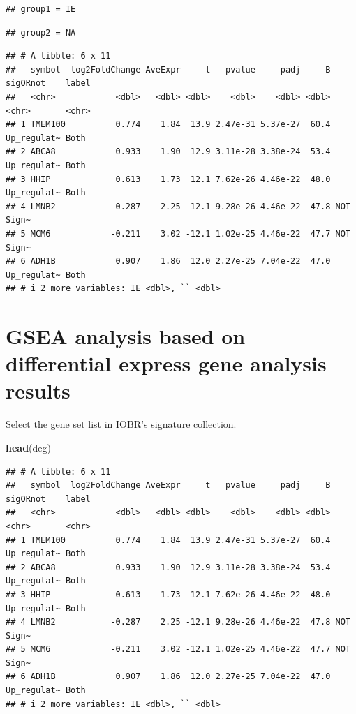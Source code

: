\documentclass[
  12pt,
]{book}
\newenvironment{Shaded}{\begin{snugshade}}{\end{snugshade}}
\newcommand{\FunctionTok}[1]{\textcolor[rgb]{0.13,0.29,0.53}{\textbf{#1}}}
\newcommand{\NormalTok}[1]{#1}
\begin{document}
\begin{verbatim}
## group1 = IE
\end{verbatim}

\begin{verbatim}
## group2 = NA
\end{verbatim}

\begin{verbatim}
## # A tibble: 6 x 11
##   symbol  log2FoldChange AveExpr     t   pvalue     padj     B sigORnot    label
##   <chr>            <dbl>   <dbl> <dbl>    <dbl>    <dbl> <dbl> <chr>       <chr>
## 1 TMEM100          0.774    1.84  13.9 2.47e-31 5.37e-27  60.4 Up_regulat~ Both 
## 2 ABCA8            0.933    1.90  12.9 3.11e-28 3.38e-24  53.4 Up_regulat~ Both 
## 3 HHIP             0.613    1.73  12.1 7.62e-26 4.46e-22  48.0 Up_regulat~ Both 
## 4 LMNB2           -0.287    2.25 -12.1 9.28e-26 4.46e-22  47.8 NOT         Sign~
## 5 MCM6            -0.211    3.02 -12.1 1.02e-25 4.46e-22  47.7 NOT         Sign~
## 6 ADH1B            0.907    1.86  12.0 2.27e-25 7.04e-22  47.0 Up_regulat~ Both 
## # i 2 more variables: IE <dbl>, `` <dbl>
\end{verbatim}

\hypertarget{gsea-analysis-based-on-differential-express-gene-analysis-results}{%
\section{GSEA analysis based on differential express gene analysis results}\label{gsea-analysis-based-on-differential-express-gene-analysis-results}}

Select the gene set list in IOBR's signature collection.

\begin{Shaded}
\begin{Highlighting}[]
\FunctionTok{head}\NormalTok{(deg)}
\end{Highlighting}
\end{Shaded}

\begin{verbatim}
## # A tibble: 6 x 11
##   symbol  log2FoldChange AveExpr     t   pvalue     padj     B sigORnot    label
##   <chr>            <dbl>   <dbl> <dbl>    <dbl>    <dbl> <dbl> <chr>       <chr>
## 1 TMEM100          0.774    1.84  13.9 2.47e-31 5.37e-27  60.4 Up_regulat~ Both 
## 2 ABCA8            0.933    1.90  12.9 3.11e-28 3.38e-24  53.4 Up_regulat~ Both 
## 3 HHIP             0.613    1.73  12.1 7.62e-26 4.46e-22  48.0 Up_regulat~ Both 
## 4 LMNB2           -0.287    2.25 -12.1 9.28e-26 4.46e-22  47.8 NOT         Sign~
## 5 MCM6            -0.211    3.02 -12.1 1.02e-25 4.46e-22  47.7 NOT         Sign~
## 6 ADH1B            0.907    1.86  12.0 2.27e-25 7.04e-22  47.0 Up_regulat~ Both 
## # i 2 more variables: IE <dbl>, `` <dbl>
\end{verbatim}
\end{document}
